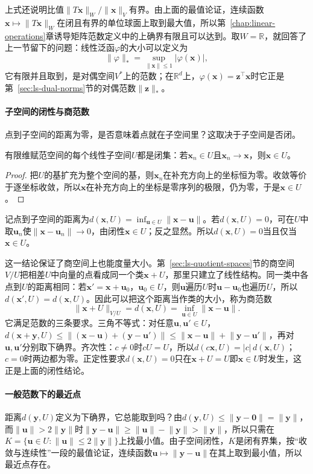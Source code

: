 上式还说明比值$\lVert T\bm x\rVert_W/\lVert\bm x\rVert_V$有界。由上面的最值论证，连续函数$\bm x\mapsto\lVert T\bm x\rVert_W$在闭且有界的单位球面上取到最大值，所以第~\ref{chap:linear-operations}章诱导矩阵范数定义中的上确界有限且可以达到。取$W=\mathbb R$，就回答了上一节留下的问题：线性泛函$\varphi$的大小可以定义为
\[
 \lVert\varphi\rVert_*=\sup_{\lVert\bm x\rVert\leq1}|\varphi(\bm x)|,
\]
它有限并且取到，是对偶空间$V^*$上的范数；在$\mathbb R^d$上，$\varphi(\bm x)=\bm z^\top\bm x$时它正是第~\ref{sec:ls-dual-norms}节的对偶范数$\lVert\bm z\rVert_*$。

\paragraph{子空间的闭性与商范数}
\label{sec:ls-quotient-norms}
点到子空间的距离为零，是否意味着点就在子空间里？这取决于子空间是否闭。
\begin{theorem}[有限维子空间闭性]
\label{thm:ls-subspace-closed}
有限维赋范空间的每个线性子空间$U$都是闭集：若$\bm x_n\in U$且$\bm x_n\to\bm x$，则$\bm x\in U$。
\end{theorem}
\begin{proof}
把$U$的基扩充为整个空间的基，则$\bm x_n$在补充方向上的坐标恒为零。收敛等价于逐坐标收敛，所以$\bm x$在补充方向上的坐标是零序列的极限，仍为零，于是$\bm x\in U$。
\end{proof}
记点到子空间的距离为$d(\bm x,U)=\inf_{\bm u\in U}\lVert\bm x-\bm u\rVert$。若$d(\bm x,U)=0$，可在$U$中取$\bm u_n$使$\lVert\bm x-\bm u_n\rVert\to0$，由闭性$\bm x\in U$；反之显然。所以$d(\bm x,U)=0$当且仅当$\bm x\in U$。

这一结论保证了商空间上也能度量大小。第~\ref{sec:ls-quotient-spaces}节的商空间$V/U$把相差$U$中向量的点看成同一个类$\bm x+U$，那里只建立了线性结构。同一类中各点到$U$的距离相同：若$\bm x'=\bm x+\bm u_0$，$\bm u_0\in U$，则$\bm u$遍历$U$时$\bm u-\bm u_0$也遍历$U$，所以$d(\bm x',U)=d(\bm x,U)$。因此可以把这个距离当作类的大小，称为商范数
\[
 \lVert\bm x+U\rVert_{V/U}=d(\bm x,U)=\inf_{\bm u\in U}\lVert\bm x-\bm u\rVert .
\]
它满足范数的三条要求。三角不等式：对任意$\bm u,\bm u'\in U$，$d(\bm x+\bm y,U)\leq\lVert(\bm x-\bm u)+(\bm y-\bm u')\rVert\leq\lVert\bm x-\bm u\rVert+\lVert\bm y-\bm u'\rVert$，再对$\bm u,\bm u'$分别取下确界。齐次性：$c\neq0$时$cU=U$，所以$d(c\bm x,U)=|c|\,d(\bm x,U)$；$c=0$时两边都为零。正定性要求$d(\bm x,U)=0$只在$\bm x+U=U$即$\bm x\in U$时发生，这正是上面的闭性结论。

\paragraph{一般范数下的最近点}
距离$d(\bm y,U)$定义为下确界，它总能取到吗？由$d(\bm y,U)\leq\lVert\bm y-\bm0\rVert=\lVert\bm y\rVert$，而$\lVert\bm u\rVert>2\lVert\bm y\rVert$时$\lVert\bm y-\bm u\rVert\geq\lVert\bm u\rVert-\lVert\bm y\rVert>\lVert\bm y\rVert$，所以只需在$K=\{\bm u\in U:\lVert\bm u\rVert\leq2\lVert\bm y\rVert\}$上找最小值。由子空间闭性，$K$是闭有界集，按“收敛与连续性”一段的最值论证，连续函数$\bm u\mapsto\lVert\bm y-\bm u\rVert$在其上取到最小值，所以最近点存在。


